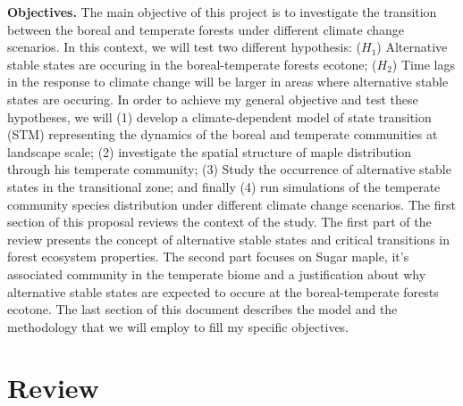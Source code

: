 \textbf{Objectives.} The main objective of this project is to investigate the
transition between the boreal and temperate forests under different climate
change scenarios. In this context, we will test two different hypothesis:
($H_1$) Alternative stable states are occuring in the boreal-temperate forests
ecotone;  ($H_2$) Time lags in the response to climate change will be larger
in areas where alternative stable states are occuring. In order to achieve my
general objective and test these hypotheses, we will (1) develop a climate-dependent 
model of state transition (STM) representing the dynamics of the
boreal and temperate communities at landscape scale; (2) investigate the
spatial structure of maple distribution through his temperate community; (3)
Study the occurrence of alternative stable states in the transitional zone;
and finally (4) run simulations of the temperate community species
distribution under different climate change scenarios. The first section of
this proposal reviews the context of the study. The first part of the review
presents the concept of alternative stable states and critical transitions in
forest ecosystem properties. The second part focuses on Sugar maple, it's
associated community in the temperate biome and a justification about why
alternative stable states are expected to occure at the boreal-temperate
forests ecotone. The last section of this document describes the model and
the methodology that we will employ to fill my specific objectives. 

\section{Review} 

